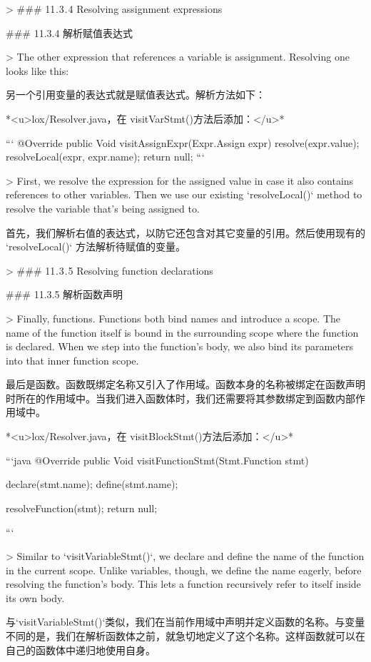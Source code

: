 \documentclass[cn,11pt,chinese]{elegantbook}
\begin{document}
{{{{{{{{{{{{{> ### 11 . 3 . 4 Resolving assignment expressions

### 11.3.4 解析赋值表达式

> The other expression that references a variable is assignment. Resolving one looks like this:

另一个引用变量的表达式就是赋值表达式。解析方法如下：

*<u>lox/Resolver.java，在 visitVarStmt()方法后添加：</u>*

```
  @Override
  public Void visitAssignExpr(Expr.Assign expr) {
    resolve(expr.value);
    resolveLocal(expr, expr.name);
    return null;
  }
```

> First, we resolve the expression for the assigned value in case it also contains references to other variables. Then we use our existing `resolveLocal()` method to resolve the variable that’s being assigned to.

首先，我们解析右值的表达式，以防它还包含对其它变量的引用。然后使用现有的 `resolveLocal()` 方法解析待赋值的变量。

> ### 11 . 3 . 5 Resolving function declarations

### 11.3.5 解析函数声明

> Finally, functions. Functions both bind names and introduce a scope. The name of the function itself is bound in the surrounding scope where the function is declared. When we step into the function’s body, we also bind its parameters into that inner function scope.

最后是函数。函数既绑定名称又引入了作用域。函数本身的名称被绑定在函数声明时所在的作用域中。当我们进入函数体时，我们还需要将其参数绑定到函数内部作用域中。

*<u>lox/Resolver.java，在 visitBlockStmt()方法后添加：</u>*

```java
  @Override
  public Void visitFunctionStmt(Stmt.Function stmt) {
    declare(stmt.name);
    define(stmt.name);

    resolveFunction(stmt);
    return null;
  }
```

> Similar to `visitVariableStmt()`, we declare and define the name of the function in the current scope. Unlike variables, though, we define the name eagerly, before resolving the function’s body. This lets a function recursively refer to itself inside its own body.

与`visitVariableStmt()`类似，我们在当前作用域中声明并定义函数的名称。与变量不同的是，我们在解析函数体之前，就急切地定义了这个名称。这样函数就可以在自己的函数体中递归地使用自身。

}}}}}}}}}}}}}
\end{document}
